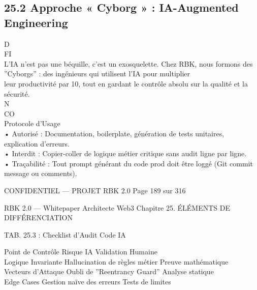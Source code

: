 \subsection{25.2 Approche « Cyborg » : IA-Augmented Engineering}
\vspace{0.5em}
\vspace{0.5em}
\vspace{0.5em}
\vspace{0.5em}
D\\
FI\\
L’IA n’est pas une béquille, c’est un exosquelette. Chez RBK, nous formons des ”Cyborgs” : des ingénieurs qui utilisent l’IA pour multiplier\\
leur productivité par 10, tout en gardant le contrôle absolu sur la qualité et la sécurité.\\
N\\
CO\\
Protocole d’Usage\\
\vspace{0.5em}
• Autorisé : Documentation, boilerplate, génération de tests unitaires, explication d’erreurs.\\
\vspace{0.5em}
• Interdit : Copier-coller de logique métier critique sans audit ligne par ligne.\\
\vspace{0.5em}
• Traçabilité : Tout prompt générant du code prod doit être loggé (Git commit message ou comments).\\
\vspace{0.5em}
\vspace{0.5em}
\vspace{0.5em}
\vspace{0.5em}
\begin{confidential}CONFIDENTIEL — PROJET RBK 2.0                                  Page 189 sur 316\end{confidential}
RBK 2.0 — Whitepaper Architecte Web3                                                             Chapitre 25. ÉLÉMENTS DE DIFFÉRENCIATION\\
\vspace{0.5em}
\vspace{0.5em}
\begin{center}\begin{tabular}TAB. 25.3 : Checklist d’Audit Code IA\end{tabular}\end{center}
\vspace{0.5em}
\vspace{0.5em}
Point de Contrôle Risque IA                       Validation Humaine\\
Logique Invariante Hallucination de règles métier Preuve mathématique\\
Vecteurs d’Attaque Oubli de ”Reentrancy Guard” Analyse statique\\
Edge Cases         Gestion naïve des erreurs      Tests de limites\\
\vspace{0.5em}
\vspace{0.5em}
\vspace{0.5em}
\vspace{0.5em}
